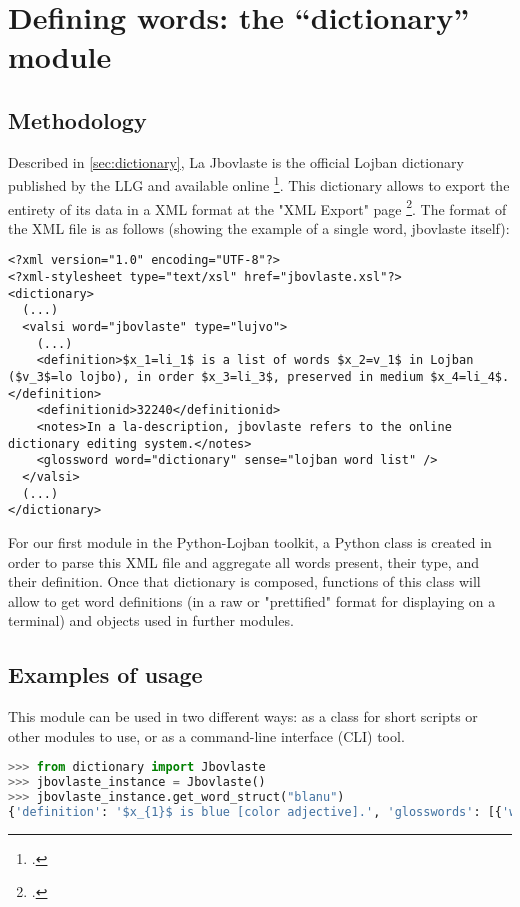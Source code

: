 \chapter{Defining words: the ``dictionary'' module}
\label{chap:creating_a_dictionary}

\section{Methodology}

Described in \ref{sec:dictionary}, La Jbovlaste is the official Lojban dictionary published by the LLG and available online \footcite{jbovlaste}.
This dictionary allows to export the entirety of its data in a XML format at the "XML Export" page \footcite{jbovlaste-export}.
The format of the XML file is as follows (showing the example of a single word, jbovlaste itself):

\begin{lstlisting}[caption=Example of word as defined in the official Lojban dictionary XML export]
<?xml version="1.0" encoding="UTF-8"?>
<?xml-stylesheet type="text/xsl" href="jbovlaste.xsl"?>
<dictionary>
  (...)
  <valsi word="jbovlaste" type="lujvo">
    (...)
    <definition>$x_1=li_1$ is a list of words $x_2=v_1$ in Lojban ($v_3$=lo lojbo), in order $x_3=li_3$, preserved in medium $x_4=li_4$.</definition>
    <definitionid>32240</definitionid>
    <notes>In a la-description, jbovlaste refers to the online dictionary editing system.</notes>
    <glossword word="dictionary" sense="lojban word list" />
  </valsi>
  (...)
</dictionary>
\end{lstlisting}

For our first module in the Python-Lojban toolkit, a Python class is created in order to parse this XML file and aggregate all words present,
their type, and their definition. Once that dictionary is composed, functions of this class will allow to get word definitions (in a raw or "prettified"
format for displaying on a terminal) and objects used in further modules.

\section{Examples of usage}

This module can be used in two different ways: as a class for short scripts or other modules to use, or as a command-line interface (CLI) tool.

\begin{lstlisting}[language=Python, caption=Jbovlaste class being used by a Python script]
>>> from dictionary import Jbovlaste
>>> jbovlaste_instance = Jbovlaste()
>>> jbovlaste_instance.get_word_struct("blanu")
{'definition': '$x_{1}$ is blue [color adjective].', 'glosswords': [{'word': 'blue', 'sense': None}], 'type': 'gismu'}
\end{lstlisting}


